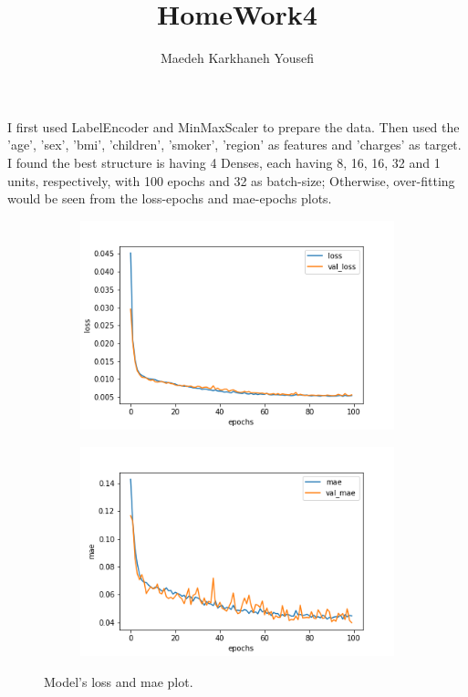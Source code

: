\documentclass[12pt]{article}
\author{Maedeh Karkhaneh Yousefi}
\title{HomeWork4}
\begin{document}
\maketitle
I first used LabelEncoder and MinMaxScaler to prepare the data. Then used the 'age', 'sex', 'bmi', 'children', 'smoker', 'region' as features and 'charges' as target. 
I found the best structure is having 4 Denses, each having 8, 16, 16, 32 and 1 units, respectively, with 100 epochs and 32 as batch-size; Otherwise, over-fitting would be seen from the loss-epochs and mae-epochs plots. 
\begin{figure}[H]
\centering
\begin{subfigure}{0.5\linewidth}
\includegraphics[width=\textwidth]{loss.png}
\end{subfigure}
\begin{subfigure}{0.5\linewidth}
\includegraphics[width=\textwidth]{mae.png}
\end{subfigure}
\label{mesh:fig1}
\caption{Model's loss and mae plot.}
\end{figure}
\end{document}
